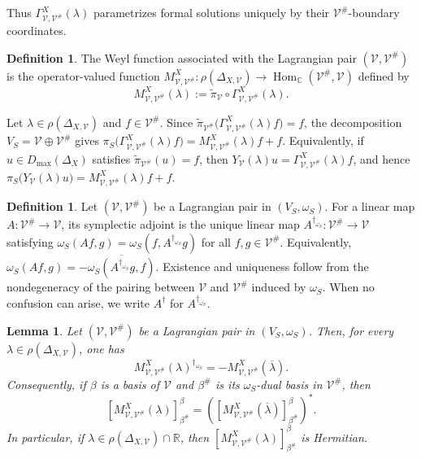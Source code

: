 \documentclass[12pt]{amsart}
\theoremstyle{plain}
\newtheorem{lem}[thm]{Lemma}
\theoremstyle{definition}
\newtheorem{defn}[thm]{Definition}
\theoremstyle{remark}
\numberwithin{equation}{section} \numberwithin{figure}{section}
\renewcommand*{\to}{\rightarrow}
\newcommand{\mb}[1]{\mathbb{#1}} %
\begin{document}
Thus \(\Gamma_{\mathcal V,\mathcal V^\#}^{X}(\lambda)\) parametrizes
formal solutions uniquely by their \(\mathcal V^\#\)-boundary
coordinates.


\begin{defn}\label{defn:Weyl-function}
The Weyl function associated with the Lagrangian pair
\((\mathcal V,\mathcal V^\#)\) is the operator-valued function
\(M_{\mathcal V,\mathcal V^\#}^{X}:
\rho(\Delta_{X,\mathcal V})\to
\operatorname{Hom}_{\mb C}(\mathcal V^\#,\mathcal V)\)
defined by
\[
M_{\mathcal V,\mathcal V^\#}^{X}(\lambda)
:=
\widetilde{\pi}_{\mathcal V}\circ
\Gamma_{\mathcal V,\mathcal V^\#}^{X}(\lambda).
\]
\end{defn}


Let \(\lambda\in\rho(\Delta_{X,\mathcal V})\) and
\(f\in\mathcal V^\#\). Since
\(\widetilde{\pi}_{\mathcal V^\#}
\bigl(
\Gamma_{\mathcal V,\mathcal V^\#}^{X}(\lambda)f
\bigr)=f\), the decomposition
\(V_S=\mathcal V\oplus\mathcal V^\#\) gives
\(
\pi_S\bigl(
\Gamma_{\mathcal V,\mathcal V^\#}^{X}(\lambda)f
\bigr)
=
M_{\mathcal V,\mathcal V^\#}^{X}(\lambda)f+f.
\)
Equivalently, if \(u\in D_{\max}(\Delta_X)\) satisfies
\(\widetilde{\pi}_{\mathcal V^\#}(u)=f\), then
\(Y_{\mathcal V}(\lambda)u
=\Gamma_{\mathcal V,\mathcal V^\#}^{X}(\lambda)f\), and hence
\(
\pi_S\bigl(Y_{\mathcal V}(\lambda)u\bigr)
=
M_{\mathcal V,\mathcal V^\#}^{X}(\lambda)f+f.
\)

\begin{defn}\label{defn:symplectic-adjoint}
Let \((\mathcal V,\mathcal V^\#)\) be a Lagrangian pair in
\((V_S,\omega_S)\). For a linear map
\(A:\mathcal V^\#\to\mathcal V\), its symplectic adjoint is the
unique linear map
\(A^{\dagger_{\omega_S}}:\mathcal V^\#\to\mathcal V\) satisfying
\(
\omega_S(Af,g)
=
\omega_S(f,A^{\dagger_{\omega_S}}g)
\)
for all \(f,g\in\mathcal V^\#\). Equivalently,
\(
\omega_S(Af,g)
=
-\overline{
\omega_S(A^{\dagger_{\omega_S}}g,f)
}.
\)
Existence and uniqueness follow from the nondegeneracy of the pairing
between \(\mathcal V\) and \(\mathcal V^\#\) induced by
\(\omega_S\). When no confusion can arise, we write
\(A^\dagger\) for \(A^{\dagger_{\omega_S}}\).
\end{defn}


\begin{lem}\label{lem:weyl-function-hermitian-symmetry}
Let \((\mathcal V,\mathcal V^\#)\) be a Lagrangian pair in
\((V_S,\omega_S)\). Then, for every
\(\lambda\in\rho(\Delta_{X,\mathcal V})\), one has
\[
M_{\mathcal V,\mathcal V^\#}^{X}(\lambda)
^{\dagger_{\omega_S}}
=
-M_{\mathcal V,\mathcal V^\#}^{X}(\overline{\lambda}).
\]
Consequently, if \(\beta\) is a basis of \(\mathcal V\) and
\(\beta^\#\) is its \(\omega_S\)-dual basis in \(\mathcal V^\#\),
then
\[
[M_{\mathcal V,\mathcal V^\#}^{X}(\lambda)]_{\beta^\#}^{\beta}
=
([M_{\mathcal V,\mathcal V^\#}^{X}(\overline{\lambda})]
_{\beta^\#}^{\beta})^*.
\]
In particular, if
\(\lambda\in\rho(\Delta_{X,\mathcal V})\cap\mb R\), then
\([M_{\mathcal V,\mathcal V^\#}^{X}(\lambda)]
_{\beta^\#}^{\beta}\) is Hermitian.
\end{lem}
\end{document}
